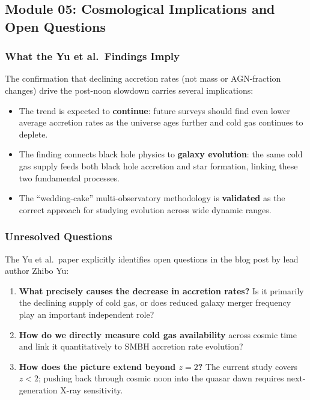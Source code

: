 \documentclass[11pt,letterpaper]{article}
\begin{document}
\subsection{Module 05: Cosmological Implications and Open Questions}

\subsubsection{What the Yu et al.\ Findings Imply}

The confirmation that declining accretion rates (not mass or AGN-fraction changes) drive the post-noon slowdown carries several implications:

\begin{itemize}
  \item The trend is expected to \textbf{continue}: future surveys should find even lower average accretion rates as the universe ages further and cold gas continues to deplete.
  \item The finding connects black hole physics to \textbf{galaxy evolution}: the same cold gas supply feeds both black hole accretion and star formation, linking these two fundamental processes.
  \item The ``wedding-cake'' multi-observatory methodology is \textbf{validated} as the correct approach for studying evolution across wide dynamic ranges.
\end{itemize}

\subsubsection{Unresolved Questions}

The Yu et al.\ paper explicitly identifies open questions in the blog post by lead author Zhibo Yu:

\begin{enumerate}
  \item \textbf{What precisely causes the decrease in accretion rates?} Is it primarily the declining supply of cold gas, or does reduced galaxy merger frequency play an important independent role?
  \item \textbf{How do we directly measure cold gas availability} across cosmic time and link it quantitatively to SMBH accretion rate evolution?
  \item \textbf{How does the picture extend beyond $z = 2$?} The current study covers $z < 2$; pushing back through cosmic noon into the quasar dawn requires next-generation X-ray sensitivity.
\end{enumerate}
\end{document}
